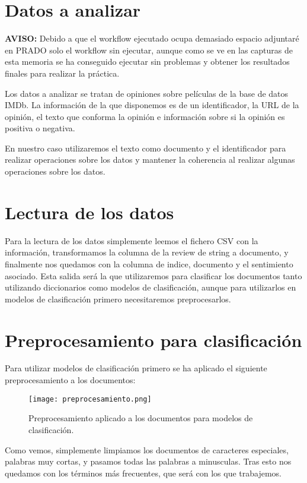 \section{Datos a analizar}

\textbf{AVISO:} Debido a que el workflow ejecutado ocupa demasiado espacio adjuntaré en PRADO solo el workflow sin ejecutar, aunque como se ve en las capturas de esta memoria se ha conseguido ejecutar sin problemas y obtener los resultados finales para realizar la práctica.

Los datos a analizar se tratan de opiniones sobre películas de la base de datos IMDb. La información de la que disponemos es de un identificador, la URL de la opinión, el texto que conforma la opinión e información sobre si la opinión es positiva o negativa.

En nuestro caso utilizaremos el texto como documento y el identificador para realizar operaciones sobre los datos y mantener la coherencia al realizar algunas operaciones sobre los datos.

\section{Lectura de los datos}

Para la lectura de los datos simplemente leemos el fichero CSV con la información, transformamos la columna de la review de string a documento, y finalmente nos quedamos con la columna de indice, documento y el sentimiento asociado. Esta salida será la que utilizaremos para clasificar los documentos tanto utilizando diccionarios como modelos de clasificación, aunque para utilizarlos en modelos de clasificación primero necesitaremos preprocesarlos.

\section{Preprocesamiento para clasificación}

Para utilizar modelos de clasificación primero se ha aplicado el siguiente preprocesamiento a los documentos:

\begin{figure}[H]
	\centering
	\texttt{[image: preprocesamiento.png]}
	\caption{Preprocesamiento aplicado a los documentos para modelos de clasificación.}
	\label{fig:preprocesamiento}
\end{figure}


Como vemos, simplemente limpiamos los documentos de caracteres especiales, palabras muy cortas, y pasamos todas las palabras a minusculas. Tras esto nos quedamos con los términos más frecuentes, que será con los que trabajemos.

